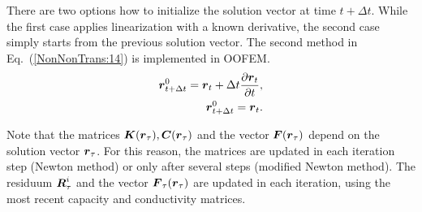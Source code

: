 \documentclass[a4paper]{article}
\newcommand{\mbf}[1]{\mbox{\boldmath$#1$}}
\newcommand{\refeq}[1]{Eq.~(\ref{#1})}
\begin{document}
There are two options how to initialize the solution vector at time $t + \Delta t$. While the first case applies linearization with a known derivative, the second case simply starts from the previous solution vector. The second method in \refeq{NonNonTrans:14} is implemented in OOFEM.
\begin{eqnarray}
\mbf{r}_{t+\Delta t}^{0} = \mbf{r}_t + \Delta t\frac{\partial{\mbf{r}_t}}{\partial t},\label{NonNonTrans:13}\\
\mbf{r}_{t+\Delta t}^{0} = \mbf{r}_t.\label{NonNonTrans:14}
\end{eqnarray}

Note that the matrices $\mbf{K}(\mbf{r}_\tau), \mbf{C}(\mbf{r}_\tau)$ and the vector $\mbf{F}(\mbf{r}_\tau)$ depend on the solution vector $\mbf{r}_\tau$. For this reason, the matrices are updated in each iteration step (Newton method) or only after several steps (modified Newton method). The residuum $\mbf{R}_\tau^{i}$ and the vector $\mbf{F}_\tau(\mbf{r}_\tau)$ are updated in each iteration, using the most recent capacity and conductivity matrices.
\end{document}
